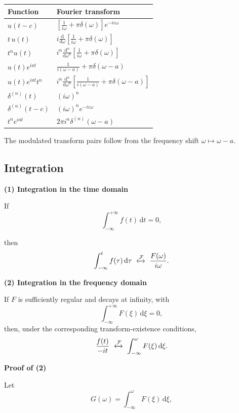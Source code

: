 \documentclass[11pt,a4paper]{article}
\theoremstyle{definition}
\theoremstyle{plain}
\begin{document}
\begingroup
\small
\renewcommand{\arraystretch}{1.65}
\everymath{\displaystyle}
\begin{longtable}{@{}p{}p{}@{}}
\toprule
Function & Fourier transform \\
\midrule
\endhead
\bottomrule
\endlastfoot
\(u(t-c)\) &
\(\left[\frac1{i\omega}+\pi\delta(\omega)\right]e^{-ic\omega}\) \\
\(t\,u(t)\) &
\(i\frac{\mathrm d}{\mathrm d\omega}\left[\frac1{i\omega}+\pi\delta(\omega)\right]\) \\
\(t^nu(t)\) &
\(i^n\frac{\mathrm d^n}{\mathrm d\omega^n}\left[\frac1{i\omega}+\pi\delta(\omega)\right]\) \\
\(u(t)e^{iat}\) & \(\frac1{i(\omega-a)}+\pi\delta(\omega-a)\) \\
\(u(t)e^{iat}t^n\) &
\(i^n\frac{\mathrm d^n}{\mathrm d\omega^n}\left[\frac1{i(\omega-a)}+\pi\delta(\omega-a)\right]\) \\
\(\delta^{(n)}(t)\) & \((i\omega)^n\) \\
\(\delta^{(n)}(t-c)\) & \((i\omega)^ne^{-ic\omega}\) \\
\(t^ne^{iat}\) & \(2\pi i^n\delta^{(n)}(\omega-a)\) \\
\end{longtable}
\endgroup

The modulated transform pairs follow from the frequency shift
\(\omega\mapsto\omega-a\).

\subsection{Integration}

\textbf{(1) Integration in the time domain}

If
\[
\int_{-\infty}^{+\infty}f(t)\,\mathrm dt=0,
\]

then
\[
\int_{-\infty}^{t}f(\tau)\,\mathrm d\tau
\ \xleftrightarrow{\mathcal F}\
\frac{F(\omega)}{i\omega}.
\]

\textbf{(2) Integration in the frequency domain}

If \(F\) is sufficiently regular and decays at infinity, with
\[
\int_{-\infty}^{+\infty}F(\xi)\,\mathrm d\xi=0,
\]
then, under the corresponding transform-existence conditions,
\[
\frac{f(t)}{-it}
\ \xleftrightarrow{\mathcal F}\
\int_{-\infty}^{\omega}F(\xi)\,\mathrm d\xi.
\]

\textbf{Proof of (2)}\par\nopagebreak[4]
Let
\[
G(\omega)=\int_{-\infty}^{\omega}F(\xi)\,\mathrm d\xi,
\]
\end{document}
